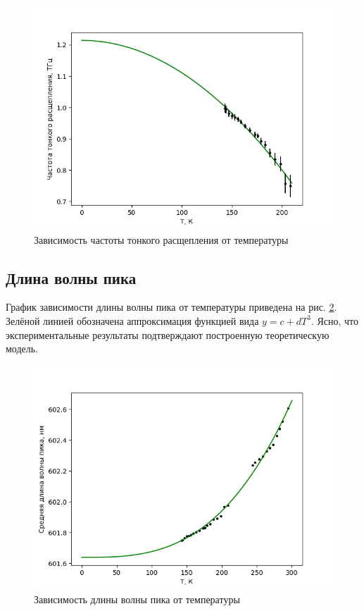 \begin{figure}[!h]
    \begin{center}
        \includegraphics[width=0.55 \linewidth]{delta_frequence.png}
        \caption{Зависимость частоты тонкого расщепления от температуры}
        \label{delta_frequence}
    \end{center}
\end{figure}


\subsection{Длина волны пика}
График зависимости длины волны пика от температуры приведена на рис. 
\ref{mean_peak_wavelenght}. Зелёной линией обозначена аппроксимация 
функцией вида $y = c + dT^3$. Ясно, что экспериментальные результаты
подтверждают построенную теоретическую модель.


\begin{figure}[!h]
    \begin{center}
        \includegraphics[width=0.55 \linewidth]{mean_peak_wavelenght.png}
        \caption{Зависимость длины волны пика от температуры}
        \label{mean_peak_wavelenght}
    \end{center}
\end{figure}




